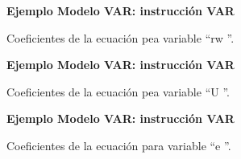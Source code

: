 		\begin{figure}[H]
		\centering
		\textbf{Ejemplo Modelo VAR: instrucción VAR}\par\medskip
		\caption{Coeficientes de la ecuación pea variable \textquotedblleft rw \textquotedblright.}\label{fig36}
	\end{figure}
		\begin{figure}[H]
		\centering
		\textbf{Ejemplo Modelo VAR: instrucción VAR}\par\medskip
		\caption{Coeficientes de la ecuación pea variable \textquotedblleft U \textquotedblright.}\label{fig37}
	\end{figure}
		\begin{figure}[H]
		\centering
		\textbf{Ejemplo Modelo VAR: instrucción VAR}\par\medskip
		\caption{Coeficientes de la ecuación para variable \textquotedblleft e \textquotedblright.}\label{fig38}
	\end{figure}
